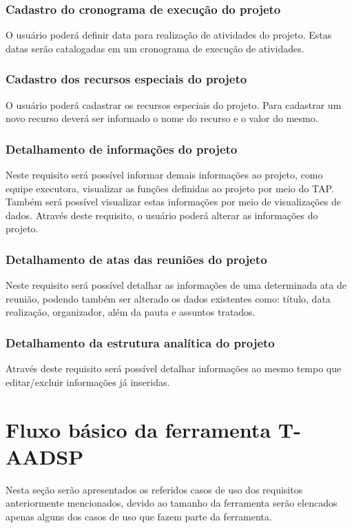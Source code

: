 \documentclass{acm_proc_article-sp}
\begin{document}
\subsubsection{Cadastro do cronograma de execução do projeto}
O usuário poderá definir data para realização de atividades do projeto. Estas datas serão catalogadas em um cronograma de execução de atividades.

\subsubsection{Cadastro dos recursos especiais do projeto}
O usuário poderá cadastrar os recursos especiais do projeto. Para cadastrar um novo recurso deverá ser informado o nome do recurso e o valor do mesmo.

\subsubsection{Detalhamento de informações do projeto}
Neste requisito será possível informar demais informações ao projeto, como equipe executora, visualizar as funções definidas ao projeto por meio do TAP. Também será possível visualizar estas informações por meio de visualizações de dados. Através deste requisito, o usuário poderá alterar as informações do projeto. 

\subsubsection{Detalhamento de atas das reuniões do projeto}
Neste requisito será possível detalhar as informações de uma determinada ata de reunião, podendo também ser alterado os dados existentes como: título, data realização, organizador, além da pauta e assuntos tratados.

\subsubsection{Detalhamento da estrutura analítica do projeto}
Através deste requisito será possível detalhar informações ao mesmo tempo que editar/excluir informações já inseridas.

\section{Fluxo básico da ferramenta T-AADSP}
Nesta seção serão apresentados os referidos casos de uso dos requisitos anteriormente mencionados, devido ao tamanho da ferramenta serão elencados apenas alguns dos casos de uso que fazem parte da ferramenta.
\end{document}

